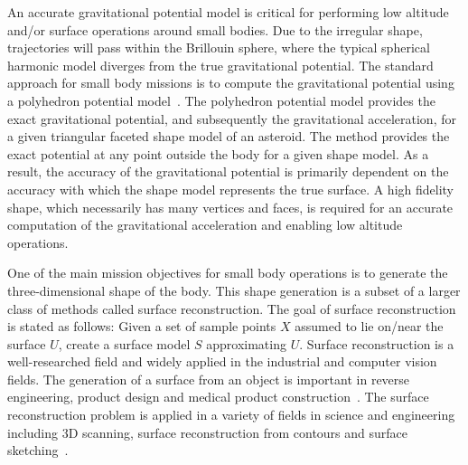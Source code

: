 An accurate gravitational potential model is critical for performing low altitude and/or surface operations around small bodies.
Due to the irregular shape, trajectories will pass within the Brillouin sphere, where the typical spherical harmonic model diverges from the true gravitational potential.
The standard approach for small body missions is to compute the gravitational potential using a polyhedron potential model~\cite{werner1996}.
The polyhedron potential model provides the exact gravitational potential, and subsequently the gravitational acceleration, for a given triangular faceted shape model of an asteroid.
The method provides the exact potential at any point outside the body for a given shape model.
As a result, the accuracy of the gravitational potential is primarily dependent on the accuracy with which the shape model represents the true surface.
A high fidelity shape, which necessarily has many vertices and faces, is required for an accurate computation of the gravitational acceleration and enabling low altitude operations.

One of the main mission objectives for small body operations is to generate the three-dimensional shape of the body.
This shape generation is a subset of a larger class of methods called surface reconstruction.
The goal of surface reconstruction is stated as follows: Given a set of sample points \( X\) assumed to lie on/near the surface \( U \), create a surface model \( S \) approximating \( U \).
Surface reconstruction is a well-researched field and widely applied in the industrial and computer vision fields.
The generation of a surface from an object is important in reverse engineering, product design and medical product construction~\cite{amenta2001}.
The surface reconstruction problem is applied in a variety of fields in science and engineering including 3D scanning, surface reconstruction from contours and surface sketching~\cite{hoppe1992}.

